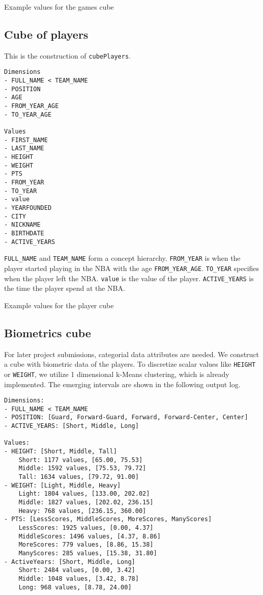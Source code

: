 \documentclass{article}
\begin{document}
\begin{table}[h]
    \centering
    \begin{adjustbox}{max width=\textwidth}
    
    \end{adjustbox}
    \caption{Example values for the games cube}
\end{table}

\subsection{Cube of players}
This is the construction of \texttt{cubePlayers}.
\begin{lstlisting}
Dimensions
- FULL_NAME < TEAM_NAME
- POSITION
- AGE
- FROM_YEAR_AGE
- TO_YEAR_AGE

Values
- FIRST_NAME
- LAST_NAME
- HEIGHT
- WEIGHT
- PTS
- FROM_YEAR
- TO_YEAR
- value
- YEARFOUNDED
- CITY
- NICKNAME
- BIRTHDATE
- ACTIVE_YEARS
\end{lstlisting}
\texttt{FULL\_NAME} and \texttt{TEAM\_NAME} form a concept hierarchy.
\texttt{FROM\_YEAR} is when the player started playing in the NBA with the age \texttt{FROM\_YEAR\_AGE}.
\texttt{TO\_YEAR} specifies when the player left the NBA.
\texttt{value} is the value of the player.
\texttt{ACTIVE\_YEARS} is the time the player spend at the NBA.

\begin{table}[h]
    \centering
    \begin{adjustbox}{max width=\textwidth}
    
    \end{adjustbox}
    \caption{Example values for the player cube}
\end{table}

\subsection{Biometrics cube}
For later project submissions, categorial data attributes are needed.
We construct a cube with biometric data of the players.
To discretize scalar values like \texttt{HEIGHT} or \texttt{WEIGHT}, we utilize 1 dimensional k-Means clustering, which is already implemented.
The emerging intervals are shown in the following output log.
\begin{lstlisting}
Dimensions:
- FULL_NAME < TEAM_NAME
- POSITION: [Guard, Forward-Guard, Forward, Forward-Center, Center]
- ACTIVE_YEARS: [Short, Middle, Long]

Values:
- HEIGHT: [Short, Middle, Tall]
    Short: 1177 values, [65.00, 75.53]
    Middle: 1592 values, [75.53, 79.72]
    Tall: 1634 values, [79.72, 91.00]
- WEIGHT: [Light, Middle, Heavy]
    Light: 1804 values, [133.00, 202.02]
    Middle: 1827 values, [202.02, 236.15]
    Heavy: 768 values, [236.15, 360.00]
- PTS: [LessScores, MiddleScores, MoreScores, ManyScores]
    LessScores: 1925 values, [0.00, 4.37]
    MiddleScores: 1496 values, [4.37, 8.86]
    MoreScores: 779 values, [8.86, 15.38]
    ManyScores: 285 values, [15.38, 31.80]
- ActiveYears: [Short, Middle, Long]
    Short: 2484 values, [0.00, 3.42]
    Middle: 1048 values, [3.42, 8.78]
    Long: 968 values, [8.78, 24.00]
\end{lstlisting}
\end{document}
